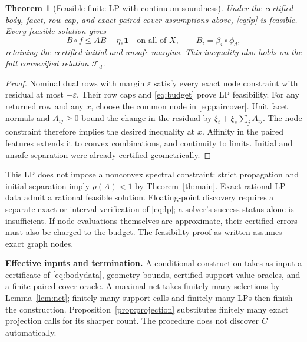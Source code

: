 \documentclass[10pt,letterpaper]{article}
\newtheorem{theorem}{Theorem}
\theoremstyle{remark}
\newcommand{\one}{\mathbf 1}
\newcommand{\F}{\mathcal F_d}
\begin{document}
\begin{theorem}[Feasible finite LP with continuum soundness]\label{th:lp}
Under the certified body, facet, row-cap, and exact paired-cover assumptions above, \eqref{eq:lp} is feasible. Every feasible solution gives
\[
 B\circ f\leq AB-\eta_*\one\quad\text{on all of }X,\qquad B_i=\beta_i\circ\phi_d,
\]
retaining the certified initial and unsafe margins. This inequality also holds on the full convexified relation $\F$.
\end{theorem}
\begin{proof}
Nominal dual rows with margin $\varepsilon$ satisfy every exact node constraint with residual at most $-\varepsilon$. Their row caps and \eqref{eq:budget} prove LP feasibility. For any returned row and any $x$, choose the common node in \eqref{eq:paircover}. Unit facet normals and $A_{ij}\geq0$ bound the change in the residual by
$\xi_t+\xi_s\sum_jA_{ij}$. The node constraint therefore implies the desired inequality at $x$. Affinity in the paired features extends it to convex combinations, and continuity to limits. Initial and unsafe separation were already certified geometrically.
\end{proof}

This LP does not impose a nonconvex spectral constraint: strict propagation and initial separation imply $\rho(A)<1$ by Theorem~\ref{th:main}. Exact rational LP data admit a rational feasible solution. Floating-point discovery requires a separate exact or interval verification of \eqref{eq:lp}; a solver's success status alone is insufficient. If node evaluations themselves are approximate, their certified errors must also be charged to the budget. The feasibility proof as written assumes exact graph nodes.

\textbf{Effective inputs and termination.}
A conditional construction takes as input a certificate of \eqref{eq:bodydata}, geometry bounds, certified support-value oracles, and a finite paired-cover oracle. A maximal net takes finitely many selections by Lemma~\ref{lem:net}; finitely many support calls and finitely many LPs then finish the construction. Proposition~\ref{prop:projection} substitutes finitely many exact projection calls for its sharper count. The procedure does not discover $C$ automatically.
\end{document}
